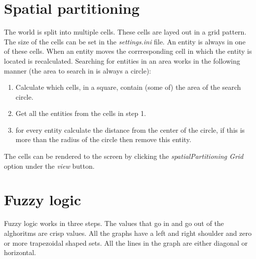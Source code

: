 \documentclass[10pt]{extarticle} %
\begin{document}
   \section {Spatial partitioning}
   The world is split into multiple cells. These cells are layed out in a grid pattern. The size of the cells can be set in the \emph{settings.ini} file. An entity is always in one of these cells. When an entity moves the corrresponding cell in which the entity is located is recalculated. Searching for entities in an area works in the following manner (the area to search in is always a circle):
   \begin{enumerate}
   \item Calculate which cells, in a square, contain (some of) the area of the search circle.
   \item Get all the entities from the cells in step 1.
   \item for every entity calculate the distance from the center of the circle, if this is more than the radius of the circle then remove this entity.
   \end{enumerate}
   The cells can be rendered to the screen by clicking the \emph{spatialPartitioning Grid} option under the \emph{view} button. 
   
    \newpage
   \section {Fuzzy logic}
   Fuzzy logic works in three steps. The values that go in and go out of the alghoritms are crisp values. All the graphs have a left and right shoulder and zero or more trapezoidal shaped sets. All the lines in the graph are either diagonal or horizontal.
\end{document}
